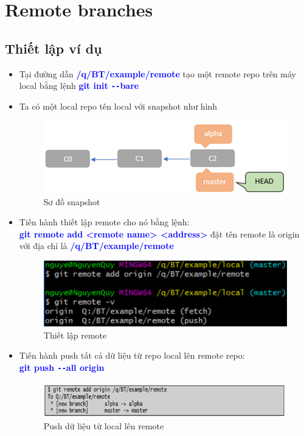 \documentclass[12pt,a4paper]{report}
\begin{document}
\section{Remote branches}
\subsection{Thiết lập ví dụ}
\begin{itemize}
\item Tại đường dẫn \textcolor{blue}{\bf /q/BT/example/remote} tạo một remote repo trên máy local bằng lệnh \textcolor{blue}{\bf git init \texttt{-{}-}bare}
\item Ta có một local repo tên local với snapshot như hình

\begin{figure}[!ht]
	\centering	
	\includegraphics[width=0.8\linewidth]{screenshot065}
	\caption{Sơ đồ snapshot}
	\label{fig:screenshot065}
\end{figure}

\item Tiến hành thiết lập remote cho nó bằng lệnh:\\ \textcolor{blue}{\bf git remote add <remote  name> <address>} đặt tên remote là origin với địa chỉ là \textcolor{blue}{\bf /q/BT/example/remote}

\begin{figure}[!ht]
	\centering
	\includegraphics[width=0.8\linewidth]{screenshot066}
\caption{Thiết lập remote}
	\label{fig:screenshot066}
	\end{figure}
	
\item Tiến hành push tất cả dữ liệu từ repo local lên remote repo:\\ \textcolor{blue}{\bf git push \texttt{-{}-}all origin}

\begin{figure}[!ht]
	\centering
	\includegraphics[width=0.8\linewidth]{screenshot07}
\caption{Push dữ liệu từ local lên remote}
	\label{fig:screenshot07}
	\end{figure}


\end{itemize}
\end{document}
